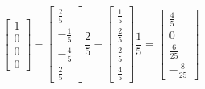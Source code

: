 \documentclass[10pt,letterpaper]{article}
\begin{document}
\begin{enumerate}[label=\textbf{(\alph{enumi})}, wide=0pt]
$$\begin{bmatrix}
1 \\
0 \\
0 \\
0 
\end{bmatrix} - \begin{bmatrix}
\frac{2}{5} \\
-\frac{1}{5} \\
-\frac{4}{5} \\
\frac{2}{5} 
\end{bmatrix}\frac{2}{5} - \begin{bmatrix}
\frac{1}{5} \\
\frac{2}{5} \\
\frac{2}{5} \\
\frac{4}{5} 
\end{bmatrix}\frac{1}{5} = \begin{bmatrix}
\frac{4}{5} \\
0 \\
\frac{6}{25} \\
-\frac{8}{25} 
\end{bmatrix}$$
\color{black}

\end{enumerate}
\end{document}
